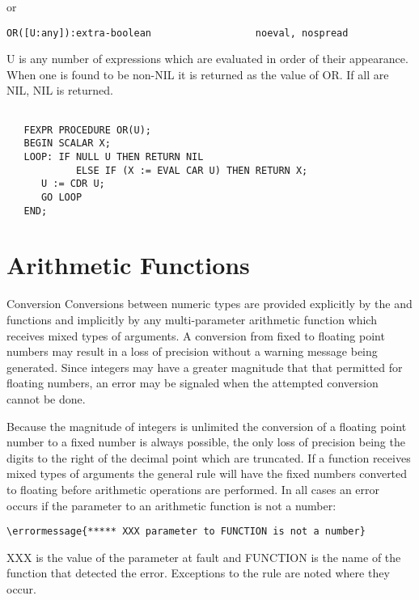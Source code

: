 \begin{Function}{or}
\begin{verbatim}
OR([U:any]):extra-boolean                  noeval, nospread
\end{verbatim}
   U  is any number  of expressions which  are evaluated in order
   of  their appearance.   When one is found to  be non-NIL it is
   returned as the value of OR. If all are NIL, NIL is returned.
\begin{verbatim}

   FEXPR PROCEDURE OR(U);
   BEGIN SCALAR X;
   LOOP: IF NULL U THEN RETURN NIL
            ELSE IF (X := EVAL CAR U) THEN RETURN X;
      U := CDR U;
      GO LOOP
   END;
\end{verbatim}
\end{Function}


\section{Arithmetic Functions}
\begin{Introduction}{Conversion}
Conversions between numeric types are provided explicitly by the
 and  functions and implicitly by any 
multi-parameter arithmetic function which receives mixed types of arguments. A
conversion from fixed to floating point numbers may result in a loss
of precision without a warning message being generated. Since
integers may have a greater magnitude that that permitted for floating
numbers, an error may be signaled when the attempted conversion cannot
be done.

 Because the magnitude of integers is unlimited the conversion
of a floating point number to a fixed number is always possible, the
only loss of precision being the digits to the right of the decimal
point which are truncated. If a function receives mixed types of
arguments the general rule will have the fixed numbers converted to
floating before arithmetic operations are performed. In all cases an
error occurs if the parameter to an arithmetic function is not a
number:
\begin{verbatim}
\errormessage{***** XXX parameter to FUNCTION is not a number}
\end{verbatim}
XXX is the value of the parameter at fault and FUNCTION is the name of
the function that detected the error. Exceptions to the rule are noted
where they occur.
\end{Introduction}


